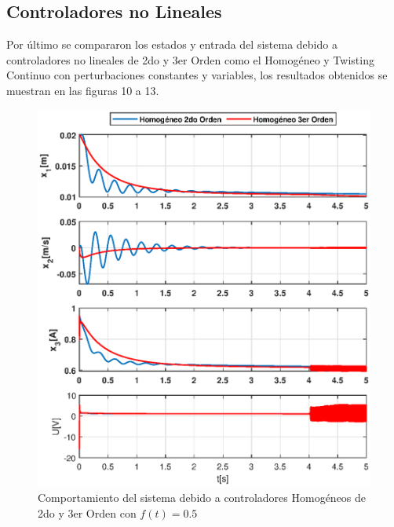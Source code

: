 \documentclass[onecolumn,10pt]{article}
\begin{document}
\subsection*{Controladores no Lineales}
Por \'ultimo se compararon los estados y entrada del sistema debido a controladores no lineales de 2do y 3er Orden como el Homog\'eneo y Twisting Continuo con perturbaciones constantes y variables, los resultados obtenidos se muestran en las figuras 10 a 13.
\begin{figure}[!h]
\centering
\includegraphics[scale=0.55]{xu_3o_h23o_pc.eps}
\caption{Comportamiento del sistema debido a controladores Homog\'eneos de 2do y 3er Orden con $f(t)=0.5$}
\end{figure}
\\
\\
\\
\\
\\
\\
\\
\\
\\
\\
\\
\\
\end{document}

